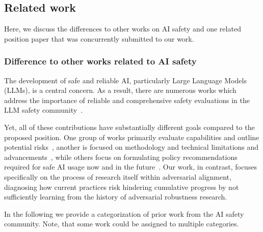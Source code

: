 \subsection{Related work}\label{app:other_works}

Here, we discuss the differences to other works on AI safety and one related position paper that was concurrently submitted to our work.

\subsubsection{Difference to other works related to AI safety}

The development of safe and reliable AI, particularly Large Language Models (LLMs), is a central concern. As a result, there are numerous works which address the importance of reliable and comprehensive safety evaluations in the LLM safety community~\cite{bommasani2021opportunities, weidinger2021ethical, ganguli2022red, liang2022holistic, hendrycks2023overview, srivastava2022beyond, chen2024trustworthy, bai2022constitutional, shevlane2023model, bowman2022measuring, sillberg2024eu, casper2023open, anwar2024foundational, casper2024black, schwinn2023adversarial, casper2023explore, reuel2024open}.

Yet, all of these contributions have substantially different goals compared to the proposed position. One group of works primarily evaluate capabilities and outline potential risks~\cite{bommasani2021opportunities, weidinger2021ethical, hendrycks2023overview, srivastava2022beyond, liang2022holistic, shevlane2023model, anwar2024foundational}, another is focused on methodology and technical limitations and advancements~\cite{ganguli2022red, chen2024trustworthy, bai2022constitutional, bowman2022measuring, casper2023open, casper2023explore}, while others focus on formulating policy recommendations required for safe AI usage now and in the future~\cite{sillberg2024eu, casper2024black, reuel2024open}. Our work, in contrast, focuses specifically on the process of research itself within adversarial alignment, diagnosing how current practices risk hindering cumulative progress by not sufficiently learning from the history of adversarial robustness research.

In the following we provide a categorization of prior work from the AI safety community. Note, that some work could be assigned to multiple categories.

